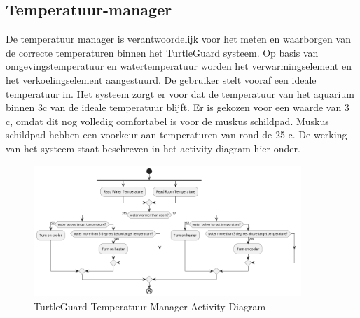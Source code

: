 \documentclass[a4paper]{report}
\newcommand{\turtleguard}{\mbox{TurtleGuard\texttrademark}\xspace}
\begin{document}
\subsection{Temperatuur-manager}
\label{sec:tempmgr}
De temperatuur manager is verantwoordelijk voor het meten en waarborgen van de correcte temperaturen binnen het \turtleguard systeem.
Op basis van omgevingstemperatuur en watertemperatuur worden het verwarmingselement en het verkoelingselement aangestuurd.
De gebruiker stelt vooraf een ideale temperatuur in. Het systeem zorgt er voor dat de temperatuur van het aquarium binnen 3\textdegree c van de ideale temperatuur blijft.
Er is gekozen voor een waarde van 3 \textdegree c, omdat dit nog volledig comfortabel is voor de muskus schildpad. Muskus schildpad hebben een voorkeur aan temperaturen van rond de 25 \textdegree c\cite{picard2011common}.
De werking van het systeem staat beschreven in het activity diagram hier onder.

\begin{figure}[H]
  \centering
  \includegraphics[width=0.9\textwidth]{Images/ActivityDiagramTemp.png}
  \caption{\turtleguard Temperatuur Manager Activity Diagram}
  \label{fig:activitydiagramtemperature}
\end{figure}
\end{document}
